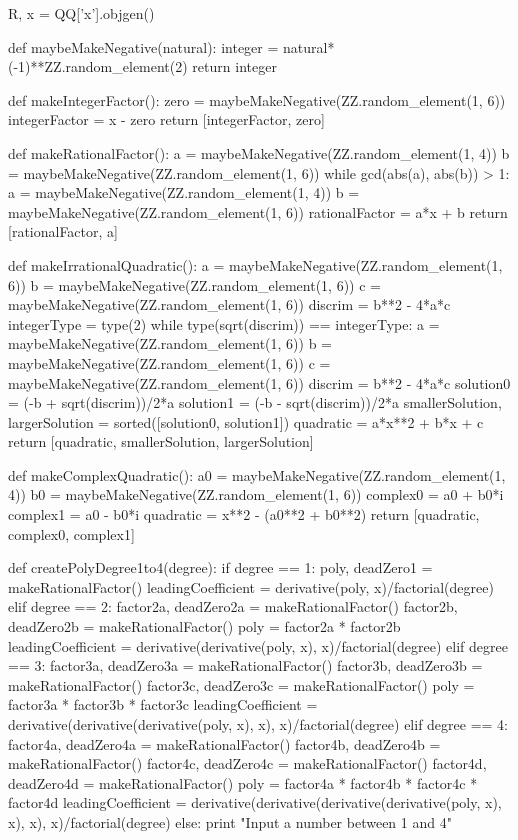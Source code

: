 \documentclass{ximera}
\begin{document}
\begin{sagesilent}
R, x = QQ['x'].objgen()
 
def maybeMakeNegative(natural):
    integer = natural*(-1)**ZZ.random_element(2)
    return integer
 
def makeIntegerFactor():
    zero = maybeMakeNegative(ZZ.random_element(1, 6))
    integerFactor = x - zero
    return [integerFactor, zero]
 
def makeRationalFactor():
    a = maybeMakeNegative(ZZ.random_element(1, 4))
    b = maybeMakeNegative(ZZ.random_element(1, 6))
    while gcd(abs(a), abs(b)) > 1:
        a = maybeMakeNegative(ZZ.random_element(1, 4))
        b = maybeMakeNegative(ZZ.random_element(1, 6))
    rationalFactor = a*x + b
    return [rationalFactor, a]
 
def makeIrrationalQuadratic():
    a = maybeMakeNegative(ZZ.random_element(1, 6))
    b = maybeMakeNegative(ZZ.random_element(1, 6))
    c = maybeMakeNegative(ZZ.random_element(1, 6))
    discrim = b**2 - 4*a*c
    integerType = type(2)
    while type(sqrt(discrim)) == integerType:
        a = maybeMakeNegative(ZZ.random_element(1, 6))
        b = maybeMakeNegative(ZZ.random_element(1, 6))
        c = maybeMakeNegative(ZZ.random_element(1, 6))
        discrim = b**2 - 4*a*c
    solution0 = (-b + sqrt(discrim))/2*a
    solution1 = (-b - sqrt(discrim))/2*a
    smallerSolution, largerSolution = sorted([solution0, solution1])
    quadratic = a*x**2 + b*x + c
    return [quadratic, smallerSolution, largerSolution]
 
def makeComplexQuadratic():
    a0 = maybeMakeNegative(ZZ.random_element(1, 4))
    b0 = maybeMakeNegative(ZZ.random_element(1, 6))
    complex0 = a0 + b0*i
    complex1 = a0 - b0*i
    quadratic = x**2 - (a0**2 + b0**2)
    return [quadratic, complex0, complex1]
 
def createPolyDegree1to4(degree):
    if degree == 1:
        poly, deadZero1 = makeRationalFactor()
        leadingCoefficient = derivative(poly, x)/factorial(degree)
    elif degree == 2:
        factor2a, deadZero2a = makeRationalFactor()
        factor2b, deadZero2b = makeRationalFactor()
        poly = factor2a * factor2b
        leadingCoefficient = derivative(derivative(poly, x), x)/factorial(degree)
    elif degree == 3:
        factor3a, deadZero3a = makeRationalFactor()
        factor3b, deadZero3b = makeRationalFactor()
        factor3c, deadZero3c = makeRationalFactor()
        poly = factor3a * factor3b * factor3c
        leadingCoefficient = derivative(derivative(derivative(poly, x), x), x)/factorial(degree)
    elif degree == 4:
        factor4a, deadZero4a = makeRationalFactor()
        factor4b, deadZero4b = makeRationalFactor()
        factor4c, deadZero4c = makeRationalFactor()
        factor4d, deadZero4d = makeRationalFactor()
        poly = factor4a * factor4b * factor4c * factor4d
        leadingCoefficient = derivative(derivative(derivative(derivative(poly, x), x), x), x)/factorial(degree)
    else:
        print "Input a number between 1 and 4"
     

\end{sagesilent}
\end{document}
